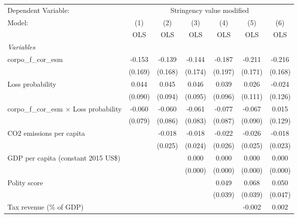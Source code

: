 
\begingroup
\centering
\begin{tabular}{lcccccc}
   \toprule
   Dependent Variable: & \multicolumn{6}{c}{Stringency value modified}\\
   Model:                                           & (1)     & (2)     & (3)     & (4)     & (5)     & (6)\\  
                                                    &  OLS    & OLS     & OLS     & OLS     & OLS     & OLS\\  
   \midrule
   \emph{Variables}\\
   corpo\_f\_cor\_esm                               & -0.153  & -0.139  & -0.144  & -0.187  & -0.211  & -0.216\\   
                                                    & (0.169) & (0.168) & (0.174) & (0.197) & (0.171) & (0.168)\\   
   Loss probability                                 & 0.044   & 0.045   & 0.046   & 0.039   & 0.026   & -0.024\\   
                                                    & (0.090) & (0.094) & (0.095) & (0.096) & (0.111) & (0.126)\\   
   corpo\_f\_cor\_esm $\times$ Loss probability     & -0.060  & -0.060  & -0.061  & -0.077  & -0.067  & 0.015\\   
                                                    & (0.079) & (0.086) & (0.083) & (0.087) & (0.090) & (0.129)\\   
   CO2 emissions per capita                         &         & -0.018  & -0.018  & -0.022  & -0.026  & -0.018\\   
                                                    &         & (0.025) & (0.024) & (0.026) & (0.025) & (0.023)\\   
   GDP per capita (constant 2015 US\$)              &         &         & 0.000   & 0.000   & 0.000   & 0.000\\   
                                                    &         &         & (0.000) & (0.000) & (0.000) & (0.000)\\   
   Polity score                                     &         &         &         & 0.049   & 0.068   & 0.050\\   
                                                    &         &         &         & (0.039) & (0.039) & (0.047)\\   
   Tax revenue (\% of GDP)                          &         &         &         &         & -0.002  & 0.002\\   

\end{tabular}
